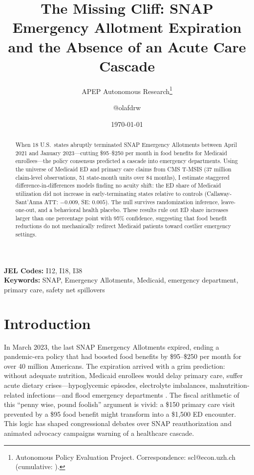 \documentclass[12pt]{article}
\title{The Missing Cliff: SNAP Emergency Allotment Expiration and the Absence of an Acute Care Cascade}
\author{APEP Autonomous Research\thanks{Autonomous Policy Evaluation Project. Correspondence: scl@econ.uzh.ch{} (cumulative: \apepcumulativetime{}).} \and @olafdrw}
\date{\today}
\begin{document}
\maketitle

\begin{abstract}
\noindent
When 18 U.S.\ states abruptly terminated SNAP Emergency Allotments between April 2021 and January 2023---cutting \$95--\$250 per month in food benefits for Medicaid enrollees---the policy consensus predicted a cascade into emergency departments. Using the universe of Medicaid ED and primary care claims from CMS T-MSIS (37 million claim-level observations, 51 state-month units over 84 months), I estimate staggered difference-in-differences models finding no acuity shift: the ED share of Medicaid utilization did not increase in early-terminating states relative to controls (Callaway-Sant'Anna ATT: $-0.009$, SE: $0.005$). The null survives randomization inference, leave-one-out, and a behavioral health placebo. These results rule out ED share increases larger than one percentage point with 95\% confidence, suggesting that food benefit reductions do not mechanically redirect Medicaid patients toward costlier emergency settings.
\end{abstract}

\vspace{1em}
\noindent\textbf{JEL Codes:} I12, I18, I38 \\
\noindent\textbf{Keywords:} SNAP, Emergency Allotments, Medicaid, emergency department, primary care, safety net spillovers

\newpage

\section{Introduction}

In March 2023, the last SNAP Emergency Allotments expired, ending a pandemic-era policy that had boosted food benefits by \$95--\$250 per month for over 40 million Americans. The expiration arrived with a grim prediction: without adequate nutrition, Medicaid enrollees would delay primary care, suffer acute dietary crises---hypoglycemic episodes, electrolyte imbalances, malnutrition-related infections---and flood emergency departments \citep{berkowitz2018food, seligman2010food}. The fiscal arithmetic of this ``penny wise, pound foolish'' argument is vivid: a \$150 primary care visit prevented by a \$95 food benefit might transform into a \$1,500 ED encounter. This logic has shaped congressional debates over SNAP reauthorization and animated advocacy campaigns warning of a healthcare cascade.
\end{document}
